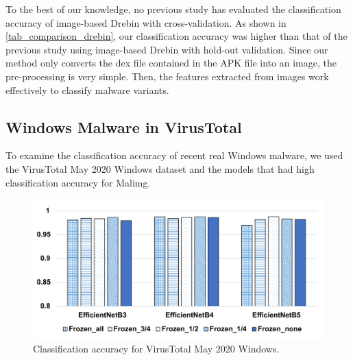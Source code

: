 \documentclass[conference]{IEEEtran}
\begin{document}
To the best of our knowledge, no previous study has evaluated the classification accuracy of image-based Drebin with cross-validation. 
As shown in \autoref{tab_comparison_drebin}, our classification accuracy was higher than that of the previous study using image-based Drebin with hold-out validation. 
Since our method only converts the dex file contained in the APK file into an image, the pre-processing is very simple. Then, the features extracted from images work effectively to classify malware variants.

\subsection{Windows Malware in VirusTotal}
\label{sec_windows}

To examine the classification accuracy of recent real Windows malware, we used the VirusTotal May 2020 Windows dataset and the models that had high classification accuracy for Malimg.

\begin{figure}[t]
	\centering
	\includegraphics[width=\linewidth,clip]{Win.pdf}
	\caption{Classification accuracy for VirusTotal May 2020 Windows.}
	\label{fig_windows}
\end{figure}

\begin{table}[t]
  \caption{Top five models for VirusTotal May 2020 Windows.}
  \label{tab_top5_windows}
  \centering
\end{table}
\end{document}
